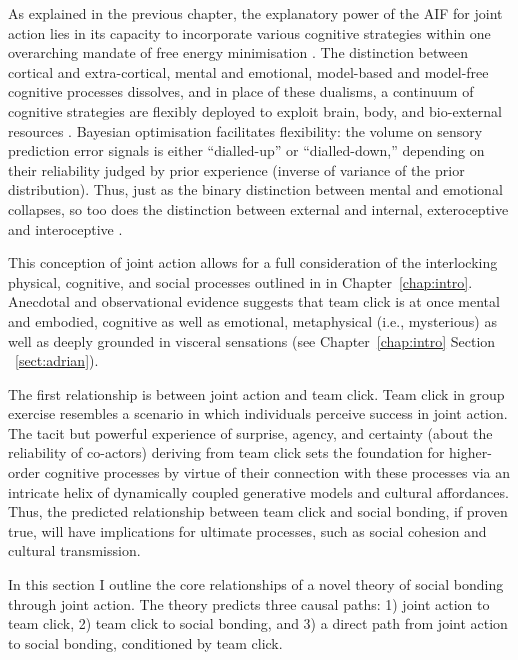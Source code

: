 \begin{CJK}{UTF8}{gbsn}
As explained in the previous chapter, the explanatory power of the AIF for joint action lies in its capacity to incorporate various cognitive strategies within one overarching mandate of free energy minimisation \citep{Clark2015}.  The distinction between cortical and extra-cortical, mental and emotional, model-based and model-free cognitive processes dissolves, and in place of these dualisms, a continuum of cognitive strategies are flexibly deployed to exploit brain, body, and bio-external resources \citep{Pezzulo2013}.  Bayesian optimisation facilitates flexibility: the volume on sensory prediction error signals is either ``dialled-up'' or ``dialled-down,'' depending on their reliability judged by prior experience (inverse of variance of the prior distribution). Thus, just as the binary distinction between mental and emotional collapses, so too does the distinction between external and internal, exteroceptive and interoceptive \citep[and proprioceptive][]{Seth2013}.

This conception of joint action allows for a full consideration of the interlocking physical, cognitive, and social processes outlined in in Chapter~\ref{chap:intro}.   Anecdotal and observational evidence suggests that team click is at once mental and embodied, cognitive as well as emotional, metaphysical (i.e., mysterious) as well as deeply grounded in visceral sensations (see Chapter~\ref{chap:intro} Section ~\ref{sect:adrian}).





    The first relationship is between joint action and team click.
    Team click in group exercise resembles a scenario in which individuals perceive success in joint action.  The tacit but powerful experience of surprise, agency, and certainty (about the reliability of co-actors) deriving from team click sets the foundation for higher-order cognitive processes by virtue of their connection with these processes via an intricate  helix of dynamically coupled generative models and cultural affordances.  Thus, the predicted relationship between team click and social bonding, if proven true, will have implications for ultimate processes, such as social cohesion and cultural transmission.


In this section I outline the core relationships of a novel theory of social bonding through joint action.  The theory predicts three causal paths: 1) joint action to team click, 2) team click to social bonding, and 3) a direct path from joint action to social bonding, conditioned by team click.


\end{CJK}
